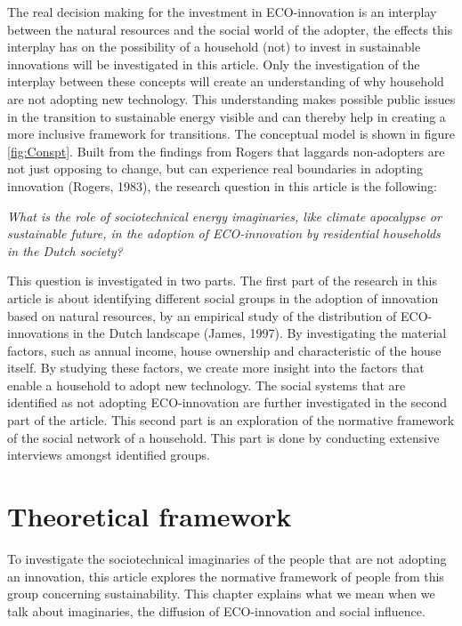 \documentclass[man,floatsintext]{apa6}
\begin{document}
The real decision making for the investment in ECO-innovation is an
interplay between the natural resources and the social world of the
adopter, the effects this interplay has on the possibility of a
household (not) to invest in sustainable innovations will be
investigated in this article. Only the investigation of the interplay
between these concepts will create an understanding of why household are
not adopting new technology. This understanding makes possible public
issues in the transition to sustainable energy visible and can thereby
help in creating a more inclusive framework for transitions. The
conceptual model is shown in figure \ref{fig:Conspt}. Built from the
findings from Rogers that laggards non-adopters are not just opposing to
change, but can experience real boundaries in adopting innovation
(Rogers, 1983), the research question in this article is the following:

\emph{What is the role of sociotechnical energy imaginaries, like
climate apocalypse or sustainable future, in the adoption of
ECO-innovation by residential households in the Dutch society?}

This question is investigated in two parts. The first part of the
research in this article is about identifying different social groups in
the adoption of innovation based on natural resources, by an empirical
study of the distribution of ECO-innovations in the Dutch landscape
(James, 1997). By investigating the material factors, such as annual
income, house ownership and characteristic of the house itself. By
studying these factors, we create more insight into the factors that
enable a household to adopt new technology. The social systems that are
identified as not adopting ECO-innovation are further investigated in
the second part of the article. This second part is an exploration of
the normative framework of the social network of a household. This part
is done by conducting extensive interviews amongst identified groups.

\section{Theoretical framework}\label{theoretical-framework}

To investigate the sociotechnical imaginaries of the people that are not
adopting an innovation, this article explores the normative framework of
people from this group concerning sustainability. This chapter explains
what we mean when we talk about imaginaries, the diffusion of
ECO-innovation and social influence.
\end{document}
